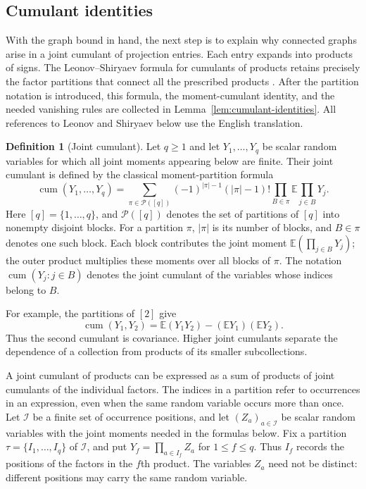 \documentclass[11pt]{article}
\theoremstyle{definition}
\newtheorem{definition}{Definition}[section]
\theoremstyle{remark}
\theoremstyle{plain}
\newcommand{\E}{\mathbb E}
\DeclareMathOperator{\cum}{cum}
\begin{document}
\subsection{Cumulant identities}\label{sec:cumulant-identities}

With the graph bound in hand, the next step is to explain why connected graphs
arise in a joint cumulant of projection entries. Each entry expands
into products of signs. The Leonov--Shiryaev formula for cumulants
of products retains precisely the factor partitions that connect
all the prescribed products
\cite[Eq.~(IV.d), p.~323]{leonov_shiryaev1959}.
After the partition notation is introduced, this formula,
the moment-cumulant identity, and the needed vanishing rules are collected in
Lemma~\ref{lem:cumulant-identities}. All references to
Leonov and Shiryaev below use the English translation.

\begin{definition}[Joint cumulant]\label{def:joint-cumulant}
Let $q\ge1$ and let $Y_1,\ldots,Y_q$ be scalar random variables
for which all joint moments appearing below are finite.
Their joint cumulant is defined by
the classical moment-partition formula
\cite[Eq.~(II.c), p.~321]{leonov_shiryaev1959}
\begin{equation}\label{eq:cumulant-definition}
 \cum(Y_1,\ldots,Y_q)=
 \sum_{\pi\in\mathcal P([q])}(-1)^{|\pi|-1}(|\pi|-1)!
                       \prod_{B\in\pi}\E\prod_{j\in B}Y_j.
\end{equation}
Here $[q]=\{1,\ldots,q\}$, and $\mathcal P([q])$ denotes the set
of partitions of $[q]$ into nonempty disjoint blocks. For a partition
$\pi$, $|\pi|$ is its number of blocks, and $B\in\pi$ denotes one
such block. Each block contributes the joint moment
$\E(\prod_{j\in B}Y_j)$; the outer product multiplies these moments
over all blocks of $\pi$. The notation $\cum(Y_j:j\in B)$ denotes
the joint cumulant of the variables whose indices belong to $B$.
\end{definition}

For example, the partitions of $[2]$ give
\[
 \cum(Y_1,Y_2)=\E(Y_1Y_2)-(\E Y_1)(\E Y_2).
\]
Thus the second cumulant is covariance. Higher joint cumulants
separate the dependence of a collection from products of its
smaller subcollections.

A joint cumulant of products can be expressed as a sum of products
of joint cumulants of the individual factors. The indices in a
partition refer to occurrences in an expression, even when the
same random variable occurs more than once.
Let $\mathcal I$ be a finite set of occurrence positions, and let
$(Z_a)_{a\in\mathcal I}$ be scalar random variables with the joint
moments needed in the formulas below. Fix a partition
$\tau=\{I_1,\ldots,I_q\}$ of $\mathcal I$, and put
$Y_f=\prod_{a\in I_f}Z_a$ for $1\le f\le q$.
Thus $I_f$ records the positions of the factors in the $f$th product.
The variables $Z_a$ need not be distinct: different positions may
carry the same random variable.
\end{document}
